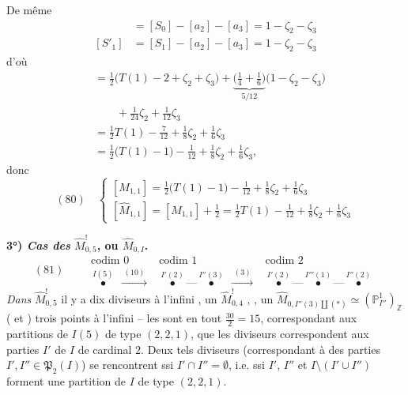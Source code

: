 \documentclass[11pt,a4paper]{article}
\begin{document}
De même
\begin{align*}
[S'_0] &= [S_0] - [a_2] - [a_3] = 1 - \zeta_2 - \zeta_3 \\
[S'_1] &= [S_1] - [a_2] - [a_3] = 1 - \zeta_2 - \zeta_3
\end{align*}
d'où
\begin{align*}
[M_{1,1}] &= \tfrac12\bigl(T(1) - 2 + \zeta_2 + \zeta_3\bigr) + \underbrace{\bigl(\tfrac14 + \tfrac16\bigr)}_{5/12}\bigl(1 - \zeta_2 - \zeta_3\bigr) \\
&\qquad + \tfrac{1}{24}\zeta_2 + \tfrac{1}{12}\zeta_3 \\
&= \tfrac12 T(1) - \tfrac{7}{12} + \tfrac18 \zeta_2 + \tfrac16 \zeta_3 \\
&= \tfrac12\bigl(T(1) - 1\bigr) - \tfrac{1}{12} + \tfrac18 \zeta_2 + \tfrac16 \zeta_3 ,
\end{align*}
donc
\[
(80)\quad
\begin{cases}
[M_{1,1}] = \tfrac12\bigl(T(1) - 1\bigr) - \tfrac{1}{12} + \tfrac18 \zeta_2 + \tfrac16 \zeta_3 \\
[\widehat{M}_{1,1}] = [M_{1,1}] + \tfrac12 = \tfrac12 T(1) - \tfrac{1}{12} + \tfrac18 \zeta_2 + \tfrac16 \zeta_3
\end{cases}
\]

\textbf{3°) \emph{Cas des} $\widehat{M}^{!}_{0,5}$, ou $\widehat{M}_{0,I}$.}
\[
(81)\qquad
\begin{array}{c|c|c}
\text{codim } 0 & \text{codim } 1 & \text{codim } 2 \\ \hline
\overset{I(5)}{\bullet} \;\xrightarrow{\;(10)\;} &
\overset{I'(2)}{\bullet}\!\text{---}\!\overset{I''(3)}{\bullet} \;\xrightarrow{\;(3)\;} &
\overset{I'(2)}{\bullet}\!\text{---}\!\overset{I'''(1)}{\bullet}\!\text{---}\!\overset{I''(2)}{\bullet}
\end{array}
\]
\emph{Dans} $\widehat{M}^{!}_{0,5}$ il y a dix \og diviseurs\fg{} à l'infini ,  un $\widehat{M}^{!}_{0,4}$ \struck{\ill{}}, , un $\widehat{M}_{0, I''(3) \amalg (*)} \simeq (\mathbb{P}^1_{I''})_{\mathbb{Z}}$  (\ill{} \ill{} et ) trois points à l'infini -- les \ill{} sont en tout $\frac{30}{2} = 15$, correspondant aux partitions de $I(5)$ de type $(2,2,1)$,  que les diviseurs \ill{} correspondent aux parties $I'$ de $I$ de cardinal $2$. Deux tels diviseurs (correspondant à des parties $I', I'' \in \mathfrak{P}_2(I)$) se rencontrent  ssi $I' \cap I'' = \emptyset$, i.e. ssi $I'$, $I''$ et $I \setminus (I' \cup I'')$  forment une partition de $I$ de type $(2,2,1)$.
\end{document}
